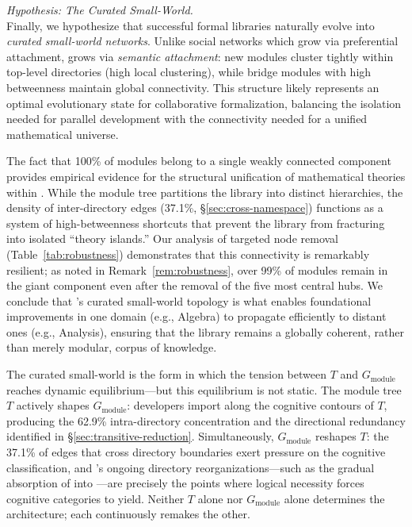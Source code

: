 \medskip
\noindent \textit{Hypothesis: The Curated Small-World.} \\
Finally, we hypothesize that successful formal libraries naturally evolve into \textit{curated small-world networks}. Unlike social networks which grow via preferential attachment,  grows via \textit{semantic attachment}: new modules cluster tightly within top-level directories (high local clustering), while bridge modules with high betweenness maintain global connectivity. This structure likely represents an optimal evolutionary state for collaborative formalization, balancing the isolation needed for parallel development with the connectivity needed for a unified mathematical universe.

The fact that 100\% of modules belong to a single weakly connected component provides empirical evidence for the structural unification of mathematical theories within . While the module tree partitions the library into distinct hierarchies, the density of inter-directory edges (37.1\%, \S\ref{sec:cross-namespace}) functions as a system of high-betweenness shortcuts that prevent the library from fracturing into isolated ``theory islands.'' Our analysis of targeted node removal (Table~\ref{tab:robustness}) demonstrates that this connectivity is remarkably resilient; as noted in Remark~\ref{rem:robustness}, over 99\% of modules remain in the giant component even after the removal of the five most central hubs. We conclude that 's curated small-world topology is what enables foundational improvements in one domain (e.g., Algebra) to propagate efficiently to distant ones (e.g., Analysis), ensuring that the library remains a globally coherent, rather than merely modular, corpus of knowledge.

The curated small-world is the form in which the tension between $T$ and $G_{\mathrm{module}}$ reaches dynamic equilibrium---but this equilibrium is not static. The module tree $T$ actively shapes $G_{\mathrm{module}}$: developers import along the cognitive contours of $T$, producing the 62.9\% intra-directory concentration and the directional redundancy identified in \S\ref{sec:transitive-reduction}. Simultaneously, $G_{\mathrm{module}}$ reshapes $T$: the 37.1\% of edges that cross directory boundaries exert pressure on the cognitive classification, and 's ongoing directory reorganizations---such as the gradual absorption of  into ---are precisely the points where logical necessity forces cognitive categories to yield. Neither $T$ alone nor $G_{\mathrm{module}}$ alone determines the architecture; each continuously remakes the other.

